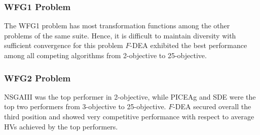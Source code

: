 \documentclass[review]{elsarticle}
\begin{document}
		
\subsubsection{WFG1 Problem}

The WFG1 problem has most transformation functions among the other problems of the same suite. Hence, it is difficult to maintain diversity with sufficient convergence for this problem
 $F$-DEA exhibited the best performance among all competing algorithms from 2-objective to 25-objective. 

\subsubsection{WFG2 Problem}
NSGAIII was the top performer in 2-objective, while PICEAg and SDE were the top two performers from 3-objective to 25-objective. $F$-DEA secured overall the third position  and showed very competitive performance with respect to average HVs achieved by the top performers.
 
%

%
\end{document}
